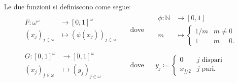 \documentclass{article}
\newcommand{\1}{\mathds{1}}
\newcommand{\N}{\mathds{N}}
\begin{document}
Le due funzioni si definiscono come segue:
\begin{align*}
&\begin{aligned}
F: \omega^{\omega} &\longrightarrow[0,1]^{\omega}\\
(x_{j})_{j \in \omega} &\longmapsto \left(\phi(x_{j})\right)_{j \in \omega}
\end{aligned} & &\text{dove} & &\begin{aligned}
\phi: \N &\longrightarrow [0,1]\\
m &\longmapsto \begin{cases}
1/m & m\neq 0\\
1 & m=0.
\end{cases}
\end{aligned}\\[1.5em]
&\begin{aligned}
G: [0,1]^{\omega} &\longrightarrow [0,1]^{\omega}\\
(x_{j})_{j \in \omega} &\longmapsto (y_{j})_{j \in \omega}
\end{aligned} & &\text{dove} &
&y_{j} \coloneqq \begin{cases}
0 & j\text{ dispari}\\
x_{j/2} & j\text{ pari}.
\end{cases}
\end{align*}
\end{document}
